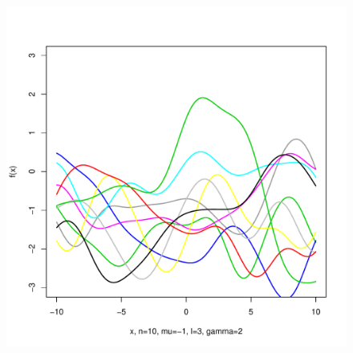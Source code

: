 \documentclass[12pt,letterpaper]{article}
\begin{document}
\begin{figure}
\begin{center}
\includegraphics[scale=0.2]{hw321/n10-m-1-l3-g4.pdf}
\end{center}
\end{figure}
\end{document}
